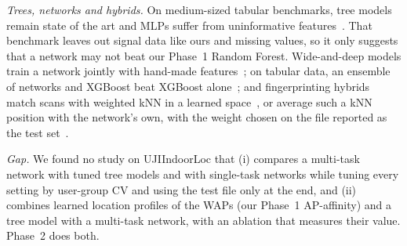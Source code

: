 \emph{Trees, networks and hybrids.} On medium-sized tabular benchmarks, tree
models remain state of the art and MLPs suffer from uninformative
features~\cite{grinsztajn2022tree}. That benchmark leaves out signal data like
ours and missing values, so it only suggests that a network may not beat our
Phase~1 Random Forest. Wide-and-deep models train a network jointly with
hand-made features~\cite{cheng2016wide}; on tabular data, an ensemble of
networks and XGBoost beat XGBoost alone~\cite{shwartzziv2022tabular}; and
fingerprinting hybrids match scans with weighted kNN in a learned
space~\cite{park2024wknn}, or average such a kNN position with the network's
own, with the weight chosen on the file reported as the test
set~\cite{li2026hybrid}.

\emph{Gap.} We found no study on UJIIndoorLoc that (i) compares a multi-task
network with tuned tree models and with single-task networks while tuning every
setting by user-group CV and using the test file only at the end, and (ii)
combines learned location profiles of the WAPs (our Phase~1 AP-affinity) and a
tree model with a multi-task network, with an ablation that measures their
value. Phase~2 does both.

